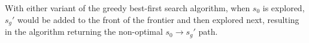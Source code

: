 \begin{enumerate}
\begin{enumerate}
\begin{solution}
\begin{minipage}[t]{0.45\linewidth}
\begin{center}
 \end{center} \end{minipage}

            With either variant of the greedy best-first search algorithm, when $s_0$ is explored, $s_g'$ would be added to the front of the frontier and then explored next, resulting in the algorithm returning the non-optimal $s_0 \to s_g'$ path.
        \end{solution}
    \end{enumerate}
\end{enumerate}